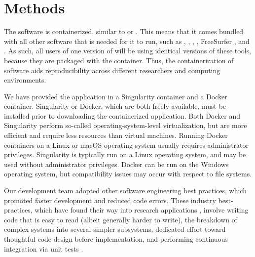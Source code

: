 \section{Methods}

The  software is containerized, similar to  or . This means that it comes bundled with all other software that is needed for it to run, such as  \parencite{esteban2019a},  \parencite{esteban2017},  \parencite{jenkinson2012},  \parencite{avants2011}, FreeSurfer \parencite{fischl2000}, and  \parencite{cox1996,cox1997}. As such, all users of one version of  will be using identical versions of these tools, because they are packaged with the container. Thus, the containerization of  software aids reproducibility across different researchers and computing environments.

We have provided the  application in a Singularity container and a Docker container. Singularity or Docker, which are both freely available, must be installed prior to downloading the containerized  application. Both Docker and Singularity perform so-called operating-system-level virtualization, but are more efficient and require less resources than virtual machines. Running Docker containers on a Linux or macOS operating system usually requires administrator privileges. Singularity is typically run on a Linux operating system, and may be used without administrator privileges. Docker can be run on the Windows operating system, but compatibility issues may occur with respect to file systems.

Our  development team adopted other software engineering best practices, which promoted faster development and reduced code errors. These industry best-practices, which have found their way into research applications \parencite{das2018}, involve writing code that is easy to read (albeit generally harder to write), the breakdown of complex systems into several simpler subsystems, dedicated effort toward thoughtful code design before implementation, and performing continuous integration via unit tests \parencite{beck2000}.






















